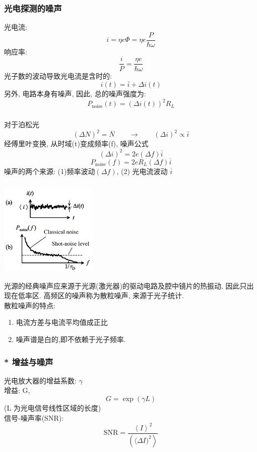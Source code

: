 \begin{frame} 
 \frametitle{光电探测的噪声}
      光电流:
      \[ i=  \eta e \varPhi = \eta e \frac{P}{\hbar \omega} \]
      响应率: 
      \[ \frac{i}{P}= \frac{\eta e }{\hbar \omega} \]
      光子数的波动导致光电流是含时的:
      \[ i(t)=  \overline{i} + \Delta i (t) \]
      另外, 电路本身有噪声, 因此, 总的噪声强度为:
      \[ P_{\text{noise}}(t)= (\Delta i (t))^2 R_L \]
\end{frame}

\begin{frame} 
 \frametitle{}
 对于泊松光
 \[ (\Delta N)^2 = \overline{N} \qquad \to \qquad (\Delta i)^2 \propto \overline{i} \]
 经傅里叶变换, 从时域(t)变成频率(f), 噪声公式
 \[(\Delta i)^2 = 2e (\Delta f) \overline{i} \]
 \[ P_{\text{noise}}(f)= 2e R_L (\Delta f) \overline{i} \]
 噪声的两个来源: (1)频率波动$(\Delta f)$, (2) 光电流波动 $\overline{i}$
\end{frame}

\begin{frame} 
      \frametitle{}   
    \begin{center}
        \includegraphics[width=0.35\textwidth]{figs/2022-05-08-09-51-35.png}
    \end{center}
    光源的经典噪声应来源于光源(激光器)的驱动电路及腔中镜片的热振动, 因此只出现在低率区. 高频区的噪声称为散粒噪声, 来源于光子统计. \\
    散粒噪声的特点: 
    \begin{enumerate}
        \item 电流方差与电流平均值成正比
        \item 噪声谱是白的,即不依赖于光子频率.
    \end{enumerate}
\end{frame}

\begin{frame} 
 \frametitle{* 增益与噪声}
      光电放大器的增益系数: $\gamma $ \\ 
      增益: G, 
      \[ G= \exp (\gamma L) \]
      (L 为光电信号线性区域的长度)\\
      信号-噪声率(SNR):
      \[\text{SNR}= \frac{\left\langle I \right\rangle^2}{\left (\langle \Delta I)^2 \right\rangle}  \]
\end{frame}

